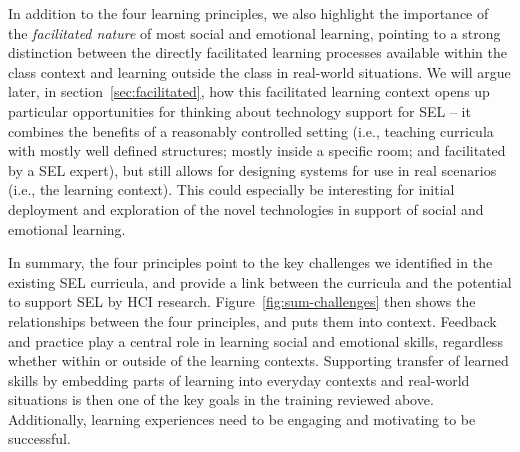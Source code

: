 \documentclass[prodmode,acmtochi]{acmsmall}
\begin{document}

\smallskip

In addition to the four learning principles, we also highlight the importance of the \emph{facilitated nature} of most social and emotional learning, pointing to a strong distinction between the directly facilitated learning processes available within the class context and learning outside the class in real-world situations. We will argue later, in section~\ref{sec:facilitated}, how this facilitated learning context opens up particular opportunities for thinking about technology support for SEL -- it combines the benefits of a reasonably controlled setting (i.e., teaching curricula with mostly well defined structures; mostly inside a specific room; and facilitated by a SEL expert), but still allows for designing systems for use in real scenarios (i.e., the learning context). This could especially be interesting for initial deployment and exploration of the novel technologies in support of social and emotional learning. 

\smallskip
In summary, the four principles point to the key challenges we identified in the existing SEL curricula, and provide a link between the curricula and the potential to support SEL by HCI research. Figure~\ref{fig:sum-challenges} then shows the relationships between the four principles, and puts them into context. Feedback and practice play a central role in learning social and emotional skills, regardless whether within or outside of the learning contexts. Supporting transfer of learned skills by embedding parts of learning into everyday contexts and real-world situations is then one of the key goals in the training reviewed above. Additionally, learning experiences need to be engaging and motivating to be successful. 
\end{document}
